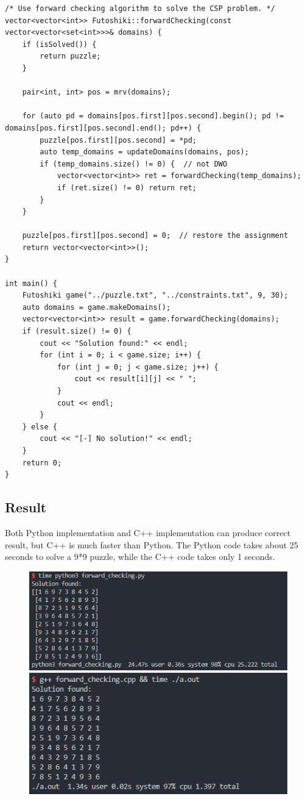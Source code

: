 \documentclass[a4paper, 11pt]{article}
\begin{document}
\begin{lstlisting}[title=cpp/forward_checking.cpp]
/* Use forward checking algorithm to solve the CSP problem. */
vector<vector<int>> Futoshiki::forwardChecking(const vector<vector<set<int>>>& domains) {
    if (isSolved()) {
        return puzzle;
    }

    pair<int, int> pos = mrv(domains);

    for (auto pd = domains[pos.first][pos.second].begin(); pd != domains[pos.first][pos.second].end(); pd++) {
        puzzle[pos.first][pos.second] = *pd;
        auto temp_domains = updateDomains(domains, pos);
        if (temp_domains.size() != 0) {  // not DWO
            vector<vector<int>> ret = forwardChecking(temp_domains);
            if (ret.size() != 0) return ret;
        }
    }

    puzzle[pos.first][pos.second] = 0;  // restore the assignment
    return vector<vector<int>>();
}

int main() {
    Futoshiki game("../puzzle.txt", "../constraints.txt", 9, 30);
    auto domains = game.makeDomains();
    vector<vector<int>> result = game.forwardChecking(domains);
    if (result.size() != 0) {
        cout << "Solution found:" << endl;
        for (int i = 0; i < game.size; i++) {
            for (int j = 0; j < game.size; j++) {
                cout << result[i][j] << " ";
            }
            cout << endl;
        }
    } else {
        cout << "[-] No solution!" << endl;
    }
    return 0;
}
\end{lstlisting}
\subsection{Result}
Both Python implementation and C++ implementation can produce correct result, but C++ is much faster than Python. The Python code takes about 25 seconds to solve a 9*9 puzzle, while the C++ code takes only 1 seconds.

\begin{figure}[ht]
\centering
\includegraphics[scale=0.9]{pyresult.png}
\includegraphics[scale=0.9]{cppresult.png}
\end{figure}
\end{document}
